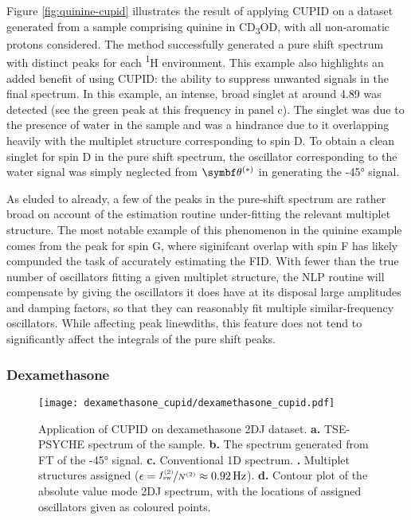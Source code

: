 Figure \ref{fig:quinine-cupid} illustrates the result of applying \ac{CUPID} on
a dataset generated from a sample comprising quinine in CD\textsubscript{3}OD,
with all non-aromatic protons considered. The method successfully generated a
pure shift spectrum with distinct peaks for each \textsuperscript{1}H
environment. This example also highlights an added benefit of using \ac{CUPID}:
the ability to suppress unwanted signals in the final spectrum. In this
example, an intense, broad singlet at around \qty{4.89}{\partspermillion}
was detected (see the green peak at this frequency in panel c).
The singlet was due to the presence of water in the sample and was a hindrance
due to it overlapping heavily with the multiplet structure corresponding to
spin D. To obtain a clean singlet for spin D in the pure shift spectrum, the
oscillator corresponding to the water signal was simply neglected from
$\bthstar$ in generating the \ang{-45} signal. 

As eluded to already, a few of the peaks in the pure-shift spectrum are rather
broad on account of the estimation routine under-fitting the relevant multiplet
structure. The most notable example of this phenomenon in the quinine example
comes from the peak for spin G, where siginifcant overlap with spin F has likely
compunded the task of accurately estimating the \ac{FID}. With fewer than the
true number of oscillators fitting a given multiplet structure, the \ac{NLP}
routine will compensate by giving the oscillators it does have at its disposal
large amplitudes and damping factors, so that they can reasonably fit multiple
similar-frequency oscillators.
While affecting peak linewdiths, this feature does not tend to significantly
affect the integrals of the pure shift peaks. 

\subsubsection{Dexamethasone}

\begin{figure}%
    \centering%
    \texttt{[image: dexamethasone\_cupid/dexamethasone\_cupid.pdf]}%
    \caption[
        Application of \ac{CUPID} on a dexamethasone dataset.
    ]{
        Application of \ac{CUPID} on dexamethasone \ac{2DJ} dataset.
        \textbf{a.} \ac{TSE-PSYCHE} spectrum of the sample.
        \textbf{b.} The spectrum generated from \ac{FT} of the \ang{-45}
        signal.
        \textbf{c.} Conventional \ac{1D} spectrum.
        \textbf{.} Multiplet structures assigned ($\epsilon =
        \nicefrac{f_{\mathrm{sw}}^{(2)}}{N^{(2)}} \approx \qty{0.92}{\hertz}$).
        \textbf{d.} Contour plot of the absolute value mode \ac{2DJ} spectrum,
        with the locations of assigned oscillators given as coloured points.
    }
    \label{fig:dexamethasone-cupid}%
\end{figure}%
